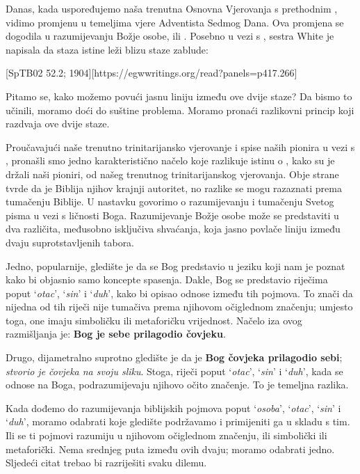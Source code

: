 
Danas, kada uspoređujemo naša trenutna Osnovna Vjerovanja s prethodnim , vidimo promjenu u temeljima vjere Adventista Sedmog Dana. Ova promjena se dogodila u razumijevanju Božje osobe, ili . Posebno u vezi s , sestra White je napisala da staza istine leži blizu staze zablude:

[SpTB02 52.2; 1904][https://egwwritings.org/read?panels=p417.266]

Pitamo se, kako možemo povući jasnu liniju između ove dvije staze? Da bismo to učinili, moramo doći do suštine problema. Moramo pronaći razlikovni princip koji razdvaja ove dvije staze.

Proučavajući naše trenutno trinitarijansko vjerovanje i spise naših pionira u vezi s , pronašli smo jedno karakteristično načelo koje razlikuje istinu o , kako su je držali naši pioniri, od našeg trenutnog trinitarijanskog vjerovanja. Obje strane tvrde da je Biblija njihov krajnji autoritet, no razlike se mogu razaznati prema tumačenju Biblije. U nastavku govorimo o razumijevanju i tumačenju Svetog pisma u vezi s ličnosti Boga. Razumijevanje Božje osobe može se predstaviti u dva različita, međusobno isključiva shvaćanja, koja jasno povlače liniju između dvaju suprotstavljenih tabora.

Jedno, popularnije, gledište je da se Bog predstavio u jeziku koji nam je poznat kako bi objasnio samo koncepte spasenja. Dakle, Bog se predstavio riječima poput ‘\textit{otac}’, ‘\textit{sin}’ i ‘\textit{duh}’, kako bi opisao odnose između tih pojmova. To znači da nijedna od tih riječi nije tumačiva prema njihovom očiglednom značenju; umjesto toga, one imaju simboličku ili metaforičku vrijednost. Načelo iza ovog razmišljanja je: \textbf{Bog je sebe prilagodio čovjeku}.

Drugo, dijametralno suprotno gledište je da je \textbf{Bog čovjeka prilagodio sebi}; \textit{stvorio je čovjeka na svoju sliku}. Stoga, riječi poput ‘\textit{otac}’, ‘\textit{sin}’ i ‘\textit{duh}’, kada se odnose na Boga, podrazumijevaju njihovo očito značenje. To je temeljna razlika.

Kada dođemo do razumijevanja biblijskih pojmova poput ‘\textit{osoba}’, ‘\textit{otac}’, ‘\textit{sin}’ i ‘\textit{duh}’, moramo odabrati koje gledište podržavamo i primijeniti ga u skladu s tim. Ili se ti pojmovi razumiju u njihovom očiglednom značenju, ili simbolički ili metaforički. Nema srednjeg puta između ovih dvaju; moramo odabrati jedno. Sljedeći citat trebao bi razriješiti svaku dilemu.



